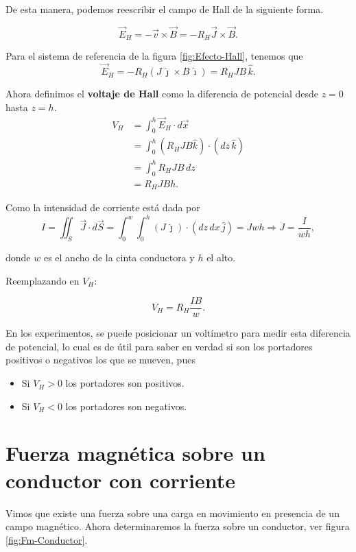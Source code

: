 De esta manera, podemos reescribir el campo de Hall de la siguiente forma.
\begin{shaded}
    $$\Vec{E}_H = - \Vec{v} \times \Vec{B} = -R_H \Vec{J} \times \Vec{B}.$$
\end{shaded}

Para el sistema de referencia de la figura \ref{fig:Efecto-Hall}, tenemos que
$$\vec{E}_H = - R_H (J\, \hat{\jmath} \times B \,\hat{\imath}) = R_H JB  \,\hat{k}.$$

Ahora definimos el \textbf{voltaje de Hall} como la diferencia de potencial desde $z = 0$ hasta $z = h$.
\begin{align*}
    V_H &= \int_0^h \vec{E}_H \cdot d\vec{x} \\
&= \int_0^h (R_H JB  \hat{k}) \cdot (dz \,\hat{k}) \\
&=\int_0^h R_H JB  \,dz \\
&= R_HJB h.
\end{align*}

Como la intensidad de corriente está dada por
$$I = \iint_S \Vec{J} \cdot d\Vec{S} = \int_0^w \int_0^h (J \,\hat{\jmath})  \cdot (dz \,dx \, \hat{j}) = J wh \Rightarrow J = \frac{I}{wh},$$

donde $w$ es el ancho de la cinta conductora y $h$ el alto.

Reemplazando en $V_H$:
\begin{shaded}
    $$V_H = R_H \frac{IB}{w}.$$
\end{shaded}

En los experimentos, se puede posicionar un voltímetro para medir esta diferencia de potencial, lo cual es de útil para saber en verdad si son los portadores positivos o negativos los que se mueven, pues

\begin{itemize}
\item Si $V_H >0$ los portadores son positivos.

\item Si $V_H < 0$ los portadores son negativos.
\end{itemize}

\section{Fuerza magnética sobre un conductor con corriente}

Vimos que existe una fuerza sobre una carga en movimiento en presencia de un campo magnético. Ahora determinaremos la fuerza sobre un conductor, ver figura \ref{fig:Fm-Conductor}.

